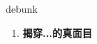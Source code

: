 
\begin{frame}
{\huge debunk}
\begin{center}
\begin{enumerate}\Large
  \item \textbf{揭穿...的真面目}
\end{enumerate}
\end{center}
\end{frame}
